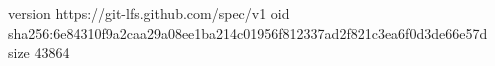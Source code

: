 version https://git-lfs.github.com/spec/v1
oid sha256:6e84310f9a2caa29a08ee1ba214c01956f812337ad2f821c3ea6f0d3de66e57d
size 43864

